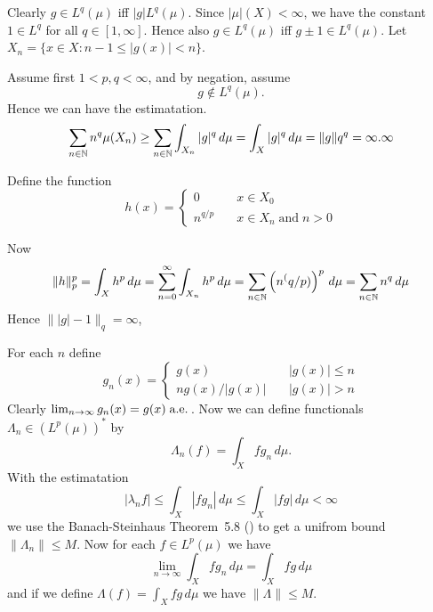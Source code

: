 \begin{enumerate}
Clearly \(g\in L^q(\mu)\) iff \(|g| L^q(\mu)\).
Since \(|\mu|(X)<\infty\), we have the constant \(1\in L^q\)
for all \(q\in[1,\infty]\). Hence also
\(g\in L^q(\mu)\) iff \(g\pm 1\in L^q(\mu)\).
Let \(X_n=\{x\in X: n-1 \leq |g(x)| < n\}\).

Assume first \(1<p,q<\infty\), and by negation, assume
\begin{equation} \label{eq:ex6.4:neg}
g\notin L^q(\mu).
\end{equation}
Hence we can have the estimatation.
\begin{equation*}
\sum_{n\in \mathbb{N}} n^q \mu(X_n)
 \geq \sum_{n\in \mathbb{N}} \int_{X_n} |g|^q\,d\mu \\
 = \int_X |g|^q\,d\mu
 = \|g\|q^q = \infty.
\infty
\end{equation*}

Define the function
\begin{equation*}
h(x) =
\left\{
 \begin{array}{ll}
 0 & \quad x\in X_0\\
 n^{q/p} & \quad x\in X_n \;\textrm{and}\; n>0
 \end{array}
\right.
\end{equation*}

Now
\begin{equation*}
\|h\|_p^p
= \int_X h^p\,d\mu
= \sum_{n=0}^\infty \int_{X_n} h^p\,d\mu
= \sum_{n\in\mathbb{N}}  \left(n^(q/p)\right)^p\,d\mu
= \sum_{n\in\mathbb{N}}  n^q\,d\mu
\end{equation*}
Hence \(\||g|-1\|_q = \infty\),

\fi

For each $n$ define
\begin{equation*}
g_n(x) =
\left\{
 \begin{array}{ll}
 g(x) & \quad |g(x)| \leq n\\
 ng(x)/|g(x)| & \quad |g(x)| > n
 \end{array}
\right.
\end{equation*}
Clearly \(\lim_{n\to\infty}g_n(x) = g(x)\;\textrm{a.e.}\)\,.
Now we can define functionals \(\Lambda_n\in (L^p(\mu))^*\) by
\begin{equation*}
\Lambda_n(f) = \int_X fg_n\,d\mu.
\end{equation*}
With the estimatation
\begin{equation*}
|\lambda_n{f}|
\leq \int_X |fg_n|\,d\mu
\leq \int_X |fg|\,d\mu
< \infty
\end{equation*}
we use the
Banach-Steinhaus Theorem~5.8 (\cite{RudinRCA87})
to get a unifrom bound \(\|\Lambda_n\|\leq M\).
Now for each \(f\in L^p(\mu)\) we have
\begin{equation*}
\lim_{n\to\infty} \int_X fg_n\,d\mu = \int_X fg\,d\mu
\end{equation*}
and if we define \(\Lambda(f) = \int_X fg\,d\mu\) we
have \(\|\Lambda\| \leq M\).



\end{enumerate}
